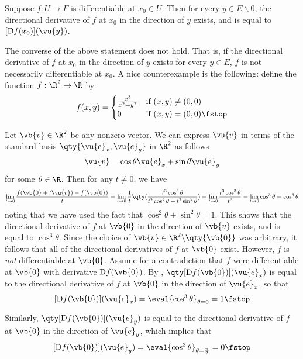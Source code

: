 \begin{corollary}
  \label{thm:direction-cor}
  Suppose \( f:U\to F \) is differentiable at \( x_0\in U \). Then for every \( y\in E\backslash\qty{0} \), the directional derivative of \( f \) at \( x_0 \) in the direction of \( y \) exists, and is equal to \( [\D f(x_0)](\vu{y}) \).
\end{corollary}

The converse of the above statement does not hold. That is, if the directional derivative of \( f \) at \( x_0 \) in the direction of \( y \) exists for every \( y\in E \), \( f \) is not necessarily differentiable at \( x_0 \). A nice counterexample is the following: define the function \( f:\R^2\to\R \) by
\[ f(x,y)=
  \begin{cases}
    \frac{x^3}{x^2+y^2} &\text{if }(x,y)\neq (0,0)\\
    0 &\text{if }(x,y)=(0,0)\fstop
  \end{cases}
\]

Let \( \vb{v}\in\R^2 \) be any nonzero vector. We can express \( \vu{v} \) in terms of the standard basis \( \qty{\vu{e}_x,\vu{e}_y} \) in \( \R^2 \) as follows
\[ \vu{v}=\cos\theta\vu{e}_x+\sin\theta\vu{e}_y \]
for some \( \theta\in\R \). Then for any \( t\neq 0 \), we have
\[ \lim_{t\to 0}\frac{f(\vb{0}+t\vu{v})-f(\vb{0})}{t}=\lim_{t\to 0}\frac{1}{t}\qty(\frac{t^3\cos^3\theta}{t^2\cos^2\theta+t^2\sin^2\theta})=\lim_{t\to 0}\frac{t^3\cos^3\theta}{t^3}=\lim_{t\to 0}\cos^3\theta=\cos^3\theta \]
noting that we have used the fact that \( \cos^2\theta+\sin^2\theta=1 \). This shows that the directional derivative of \( f \) at \( \vb{0} \) in the direction of \( \vb{v} \) exists, and is equal to \( \cos^3\theta \). Since the choice of \( \vb{v}\in\R^2\backslash\qty{\vb{0}} \) was arbitrary, it follows that all of the directional derivatives of \( f \) at \( \vb{0} \) exist. However, \( f \) is \emph{not} differentiable at \( \vb{0} \). Assume for a contradiction that \( f \) were differentiable at \( \vb{0} \) with derivative \( \D f(\vb{0}) \). By , \( \qty[\D f(\vb{0})](\vu{e}_x) \) is equal to the directional derivative of \( f \) at \( \vb{0} \) in the direction of \( \vu{e}_x \), so that
\[ [\D f(\vb{0})](\vu{e}_x)=\eval{\cos^3\theta}_{\theta=0}=1\fstop \]

Similarly, \( \qty[\D f(\vb{0})](\vu{e}_y) \) is equal to the directional derivative of \( f \) at \( \vb{0} \) in the direction of \( \vu{e}_y \), which implies that
\[ [\D f(\vb{0})](\vu{e}_y)=\eval{\cos^3\theta}_{\theta=\frac{\pi}{2}}=0\fstop \]

